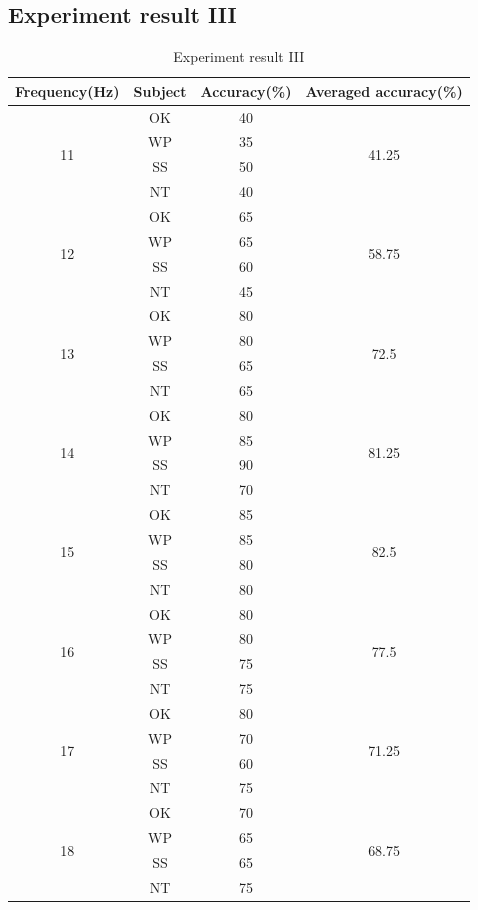 \subsection{Experiment result III}

\begin{table}[ht]
\centering
\begin{tabular}{| c | c | c | c |}

			\hline 
 			\textbf{Frequency(Hz)}&
 			\textbf{Subject}&
 			\textbf{Accuracy(\%)}&
 			\textbf{Averaged accuracy(\%)}\\
			\hline 
			\multirow{4}{*}{11}&OK&40&\multirow{4}{*}{41.25} \\
			\cline{2-3}
			&WP&35& \\ \cline{2-3}
			&SS&50& \\ \cline{2-3}
			&NT&40& \\
            \hline
			\multirow{4}{*}{12}&OK&65&\multirow{4}{*}{58.75} \\
			\cline{2-3}
			&WP&65& \\ \cline{2-3}
			&SS&60& \\ \cline{2-3}
			&NT&45& \\
            \hline
           \multirow{4}{*}{13}&OK&80&\multirow{4}{*}{72.5} \\
			\cline{2-3}
			&WP&80& \\ \cline{2-3}
			&SS&65& \\ \cline{2-3}
			&NT&65& \\
            \hline
            \multirow{4}{*}{14}&OK&80&\multirow{4}{*}{81.25} \\
			\cline{2-3}
			&WP&85& \\ \cline{2-3}
			&SS&90& \\ \cline{2-3}
			&NT&70& \\
            \hline
            \multirow{4}{*}{15}&OK&85&\multirow{4}{*}{82.5} \\
			\cline{2-3}
			&WP&85& \\ \cline{2-3}
			&SS&80& \\ \cline{2-3}
			&NT&80& \\
            \hline
            \multirow{4}{*}{16}&OK&80&\multirow{4}{*}{77.5} \\
			\cline{2-3}
			&WP&80& \\ \cline{2-3}
			&SS&75& \\ \cline{2-3}
			&NT&75& \\
            \hline
            \multirow{4}{*}{17}&OK&80&\multirow{4}{*}{71.25} \\
			\cline{2-3}
			&WP&70& \\ \cline{2-3}
			&SS&60& \\ \cline{2-3}
			&NT&75& \\
            \hline
            \multirow{4}{*}{18}&OK&70&\multirow{4}{*}{68.75} \\
			\cline{2-3}
			&WP&65& \\ \cline{2-3}
			&SS&65& \\ \cline{2-3}
			&NT&75& \\
            \hline
    \end{tabular}
\caption{Experiment result III}
\label{table:result3}
\end{table}

